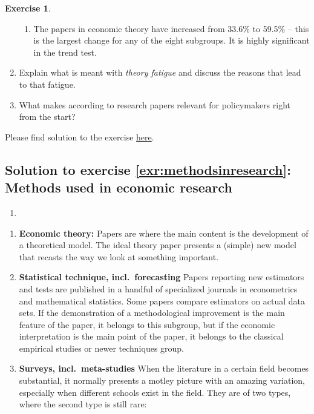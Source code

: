 \documentclass[
  12pt,
  oneside]{book}
\providecommand{\tightlist}{%
  \setlength{\itemsep}{0pt}\setlength{\parskip}{0pt}}
\theoremstyle{definition}
\theoremstyle{definition}
\theoremstyle{definition}
\newtheorem{exercise}{Exercise}[chapter]
\theoremstyle{definition}
\theoremstyle{remark}
\begin{document}
\begin{exercise}
\begin{enumerate}
\begin{enumerate}
  \item
    The papers in economic theory have increased from 33.6\% to 59.5\% -- this is the largest change for any of the eight subgroups. It is highly significant in the trend test.
  \end{enumerate}
\item
  Explain what is meant with \textit{theory fatigue} and discuss the reasons that lead to that fatigue.
\item
  What makes according to \cite{Paldam2021Methods} research papers relevant for policymakers right from the start?
\end{enumerate}

Please find solution to the exercise \protect\hyperlink{sol:methodsinresearch}{here}.
\end{exercise}

\hypertarget{sol:methodsinresearch}{%
\subsection*{Solution to exercise \ref{exr:methodsinresearch}: Methods used in economic research}\label{sol:methodsinresearch}}

\begin{enumerate}
\def\labelenumi{\alph{enumi})}
\tightlist
\item
\end{enumerate}

\begin{enumerate}
\def\labelenumi{\arabic{enumi}.}
\item
  \textbf{Economic theory:} Papers are where the main content is the development of a theoretical model. The ideal theory paper presents a (simple) new model that recasts the way we look at something important.
\item
  \textbf{Statistical technique, incl.~forecasting} Papers reporting new estimators and tests are published in a handful of specialized journals in econometrics and mathematical statistics. Some papers compare estimators on actual data sets. If the demonstration of a methodological improvement is the main feature of the paper, it belongs to this subgroup, but if the economic interpretation is the main point of the paper, it belongs to the classical empirical studies or newer techniques group.
\item
  \textbf{Surveys, incl.~meta-studies} When the literature in a certain field becomes substantial, it normally presents a motley picture with an amazing variation, especially when different schools exist in the field. They are of two types, where the second type is still rare:
\end{enumerate}
\end{document}
